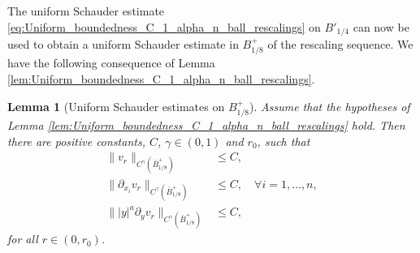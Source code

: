\documentclass[11pt,reqno]{amsart}
\newtheorem{lem}[thm]{Lemma}
\theoremstyle{definition}
\theoremstyle{remark}
\begin{document}
The uniform Schauder estimate \eqref{eq:Uniform_boundedness_C_1_alpha_n_ball_rescalings} on $B'_{1/4}$ can now be used to obtain a uniform Schauder estimate in $B^+_{1/8}$ of the rescaling sequence. We have the following consequence of Lemma \ref{lem:Uniform_boundedness_C_1_alpha_n_ball_rescalings}. 

\begin{lem}[Uniform Schauder estimates on $B^+_{1/8}$]
\label{lem:Uniform_boundedness_C_1_alpha_n_plus_1_ball_rescalings}
Assume that the hypotheses of Lemma \ref{lem:Uniform_boundedness_C_1_alpha_n_ball_rescalings} hold. Then there are positive constants, $C$, $\gamma\in (0,1)$ and $r_0$, such that
\begin{equation}
\label{eq:Uniform_boundedness_C_1_alpha_n_plus_1_ball_rescalings}
\begin{aligned}
\|v_r\|_{C^{\gamma}(\bar B^+_{1/8})} &\leq C,\\
\|\partial_{x_i} v_r\|_{C^{\gamma}(\bar B^+_{1/8})} &\leq C,\quad\forall i=1,\ldots,n,\\
\||y|^a\partial_y v_r\|_{C^{\gamma}(\bar B^+_{1/8})} &\leq C,
\end{aligned}
\end{equation}
for all $r\in (0,r_0)$.
\end{lem} 
\end{document}
